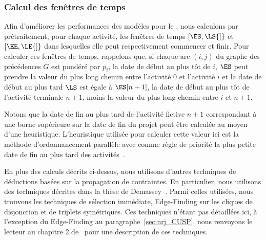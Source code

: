 \subsubsection{Calcul des fenêtres de temps}

Afin d'améliorer les performances des modèles pour le \RCPSP, nous
calculons par prétraitement, pour chaque activité, les fenêtres de
temps $[\ES,\LS{]}$ et $[\EE,\LE{]}$ dans lesquelles elle peut
respectivement commencer et finir. Pour calculer ces fenêtres de
temps, rappelons que, si chaque arc $(i,j)$ du graphe des précédences
$G$ est pondéré par $p_i$, la date de début au plus tôt de $i$, $\ES$
peut prendre la valeur du plus long chemin entre l'activité $0$ et
l'activité $i$ et la date de début au plus tard $\LS$ est égale à
$\ES[n+1]$, la date de début au plus tôt de l'activité terminale
$n+1$, moins la valeur du plus long chemin entre $i$ et $n+1$.

Notons que la date de fin au plus tard de l'activité fictive $n+1$
correspondant à une borne supérieure sur la date de fin du projet peut
être calculée au moyen d'une heuristique. L'heuristique utilisée pour
calculer cette valeur ici est la méthode d'ordonnancement parallèle
avec comme règle de priorité la plus petite date de fin au plus tard
des activités~\cite{heur_RCPSP}. 

En plus des calculs décrits ci-dessus, nous utilisons d'autres
techniques de déductions basées sur la propagation de contraintes. En
particulier, nous utilisons des techniques décrites dans la thèse de
Demassey~\cite{these_Sophie}. Parmi celles utilisées, nous trouvons
les techniques de sélection immédiate, Edge-Finding sur les cliques de
disjonction et de triplets symétriques. Ces techniques n'étant pas
détaillées ici, à l'exception du Edge-Finding au
paragraphe~\ref{sec:nrj_CUSP}, nous renvoyons le lecteur au chapitre 2
de~\cite{these_Sophie} pour une description de ces techniques.
